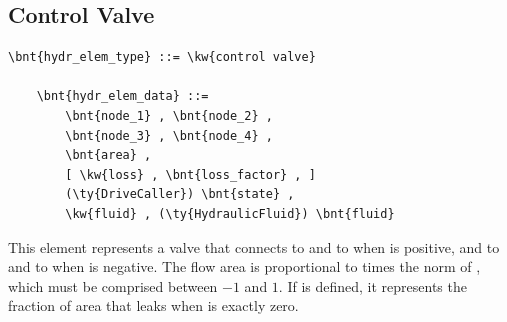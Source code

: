 \subsection{Control Valve}
\label{sec:EL:HYDR:CONTROL_VALVE}
\begin{Verbatim}[commandchars=\\\{\}]
    \bnt{hydr_elem_type} ::= \kw{control valve}

    \bnt{hydr_elem_data} ::=
        \bnt{node_1} , \bnt{node_2} ,
        \bnt{node_3} , \bnt{node_4} ,
        \bnt{area} ,
        [ \kw{loss} , \bnt{loss_factor} , ]
        (\ty{DriveCaller}) \bnt{state} ,
        \kw{fluid} , (\ty{HydraulicFluid}) \bnt{fluid}
\end{Verbatim}
This element represents a valve that connects
 to  and  to 
when  is positive, and  to 
and  to  when  is negative.
The flow area is proportional to  times the norm of ,
which must be comprised between $-1$ and $1$.
If  is defined, it represents the fraction
of area that leaks when  is exactly zero.



